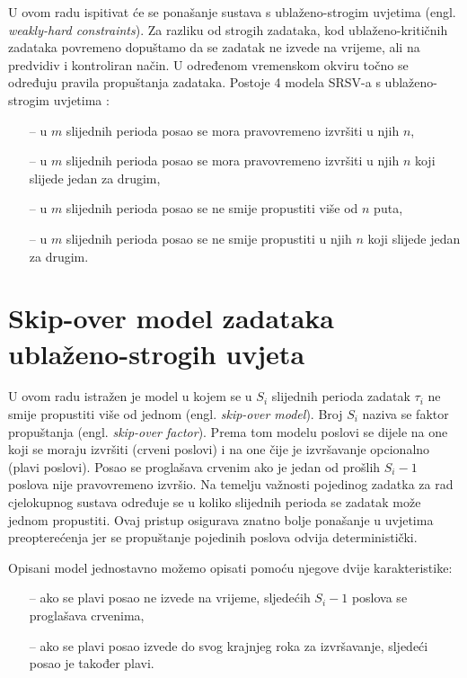\documentclass[../zavrsni.tex]{subfiles}
\begin{document}
U ovom radu ispitivat će se ponašanje sustava s ublaženo-strogim uvjetima (engl. \textit{weakly-hard constraints}). Za razliku od 
strogih zadataka, kod ublaženo-kritičnih zadataka povremeno dopuštamo da se zadatak ne izvede na vrijeme, ali na predvidiv i 
kontroliran način. U određenom vremenskom okviru točno se određuju pravila propuštanja zadataka. Postoje 4 modela SRSV-a s ublaženo-strogim uvjetima :
\begin{itemize}
    \item[--] u $m$ slijednih perioda posao se mora pravovremeno izvršiti u njih $n$,
    \item[--] u $m$ slijednih perioda posao se mora pravovremeno izvršiti u njih $n$ koji slijede jedan za drugim,
    \item[--] u $m$ slijednih perioda posao se ne smije propustiti više od $n$ puta,
    \item[--] u $m$ slijednih perioda posao se ne smije propustiti u njih $n$ koji slijede jedan za drugim.
\end{itemize}

\section{Skip-over model zadataka ublaženo-strogih uvjeta}

U ovom radu istražen je model u kojem se u $S_i$ slijednih perioda zadatak $\tau_i$ ne smije propustiti više od jednom (engl. \textit{skip-over model}).
Broj $S_i$ naziva se faktor propuštanja (engl. \textit{skip-over factor}).
Prema tom modelu 
poslovi se dijele na one koji se moraju izvršiti (crveni poslovi) i na one čije je izvršavanje opcionalno (plavi poslovi). Posao se proglašava crvenim 
ako je jedan od prošlih $S_i-1$ poslova nije pravovremeno izvršio.
Na temelju važnosti pojedinog zadatka za rad cjelokupnog sustava određuje se u koliko slijednih perioda 
se zadatak može jednom propustiti. Ovaj pristup osigurava znatno bolje ponašanje u uvjetima preopterećenja jer se propuštanje
pojedinih poslova odvija deterministički.

Opisani model jednostavno možemo opisati pomoću njegove dvije karakteristike:
\begin{itemize}
  \item[--] ako se plavi posao ne izvede na vrijeme, sljedećih $S_i-1$ poslova se proglašava crvenima,
  \item[--] ako se plavi posao izvede do svog krajnjeg roka za izvršavanje, sljedeći posao je također plavi.
\end{itemize}
\end{document}
